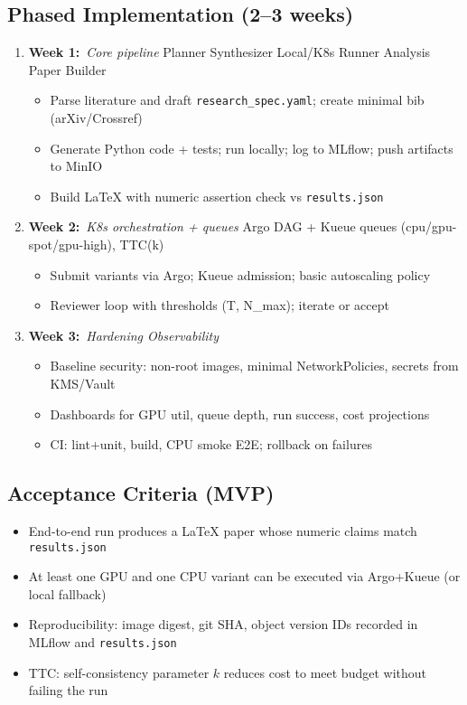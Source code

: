 \subsection*{Phased Implementation (2–3 weeks)}
\begin{enumerate}[leftmargin=1.4em]
  \item \textbf{Week 1:}\ \emph{Core pipeline}\; Planner \Rightarrow Synthesizer \Rightarrow Local/K8s Runner \Rightarrow Analysis \Rightarrow Paper Builder
    \begin{itemize}
      \item Parse literature and draft \texttt{research\_spec.yaml}; create minimal bib (arXiv/Crossref)
      \item Generate Python code + tests; run locally; log to MLflow; push artifacts to MinIO
      \item Build LaTeX with numeric assertion check vs \texttt{results.json}
    \end{itemize}
  \item \textbf{Week 2:}\ \emph{K8s orchestration + queues}\; Argo DAG + Kueue queues (cpu/gpu-spot/gpu-high), TTC(k)
    \begin{itemize}
      \item Submit variants via Argo; Kueue admission; basic autoscaling policy
      \item Reviewer loop with thresholds (T, N\_max); iterate or accept
    \end{itemize}
  \item \textbf{Week 3:}\ \emph{Hardening \/ Observability}
    \begin{itemize}
      \item Baseline security: non-root images, minimal NetworkPolicies, secrets from KMS/Vault
      \item Dashboards for GPU util, queue depth, run success, cost projections
      \item CI: lint+unit, build, CPU smoke E2E; rollback on failures
    \end{itemize}
\end{enumerate}
\subsection*{Acceptance Criteria (MVP)}
\begin{itemize}[leftmargin=1.4em]
  \item End-to-end run produces a LaTeX paper whose numeric claims match \texttt{results.json}
  \item At least one GPU and one CPU variant can be executed via Argo+Kueue (or local fallback)
  \item Reproducibility: image digest, git SHA, object version IDs recorded in MLflow and \texttt{results.json}
  \item TTC: self-consistency parameter \(k\) reduces cost to meet budget without failing the run
\end{itemize}

